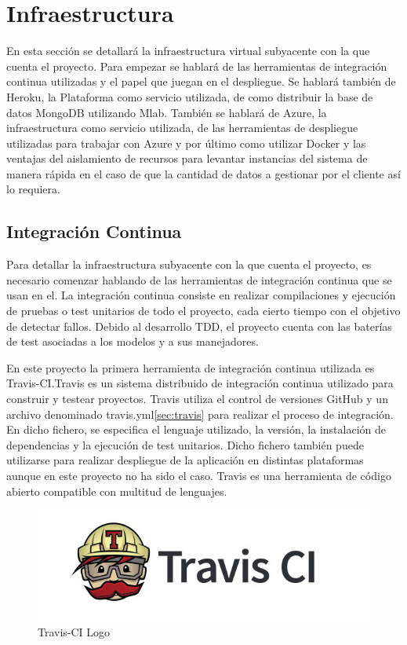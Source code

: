 \documentclass[a4paper,11pt]{book}
\begin{document}
 
\section{Infraestructura}

En esta sección se detallará la infraestructura virtual subyacente con la que cuenta el proyecto. Para empezar se hablará de las herramientas de integración continua utilizadas y el papel que juegan en el despliegue. Se hablará también de Heroku, la Plataforma como servicio utilizada, de como distribuir la base de datos MongoDB utilizando Mlab. También se hablará de Azure, la infraestructura como servicio utilizada, de las herramientas de despliegue utilizadas para trabajar con Azure y por último como utilizar Docker y las ventajas del aislamiento de recursos para levantar instancias del sistema de manera rápida en el caso de que la cantidad de datos a gestionar por el cliente así lo requiera. 

\subsection{Integración Continua}

Para detallar la infraestructura subyacente con la que cuenta el proyecto, es necesario comenzar hablando de las herramientas de integración continua que se usan en el. La integración continua consiste en realizar compilaciones y ejecución de pruebas o test unitarios de todo el proyecto, cada cierto tiempo con el objetivo de detectar fallos. Debido al desarrollo TDD, el proyecto cuenta con las baterías de test asociadas a los modelos y a sus manejadores.

En este proyecto la primera herramienta de integración continua utilizada es Travis-CI\cite{travis}.Travis es un  sistema distribuido de integración continua utilizado para construir y testear proyectos. Travis utiliza el control de versiones GitHub y un archivo denominado travis.yml\ref{sec:travis} para realizar el proceso de integración. En dicho fichero, se especifica el lenguaje utilizado, la versión, la instalación de dependencias y la ejecución de test unitarios. Dicho fichero también puede utilizarse para realizar despliegue de la aplicación en distintas plataformas aunque en este proyecto no ha sido el caso. Travis es una herramienta de código abierto compatible con multitud de lenguajes. 

\begin{figure}[H] 
\centering 
\includegraphics[scale=0.25]{imagenes/desarrollo_herramienta/travis.jpg}
\caption{ Travis-CI Logo\cite{travisL}  }  
\end{figure} 
\end{document}

